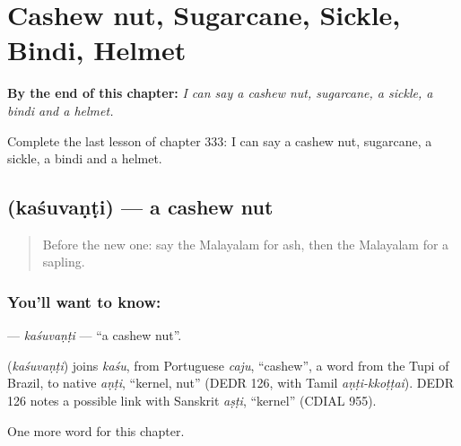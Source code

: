 
\chapter{Cashew nut, Sugarcane, Sickle, Bindi, Helmet}
\label{ch:ml-cashew-nut-sugarcane-sickle-bindi-helmet}

\begin{chapteropening}
\textbf{By the end of this chapter:} \emph{I can say a cashew nut, sugarcane, a sickle, a bindi and a helmet.}

Complete the last lesson of chapter 333: I can say a cashew nut, sugarcane, a sickle, a bindi and a helmet.
\end{chapteropening}

\section[\texorpdfstring{\ml{കശുവണ്ടി} (kaśuvaṇṭi)}{കശുവണ്ടി (kaśuvaṇṭi)}]{ (kaśuvaṇṭi) — a cashew nut}

\label{lesson:ML-C333-kasuvanti}



\begin{quote}
Before the new one: say the Malayalam for ash, then the Malayalam for a sapling.
\end{quote}

\subsection*{You'll want to know: }
\textbf{} — \emph{kaśuvaṇṭi} — \textquotedblleft{}a cashew nut\textquotedblright{}.

\begin{cousinweb}
\textbf{} (\emph{kaśuvaṇṭi}) joins \emph{kaśu}, from Portuguese \emph{caju}, \textquotedblleft{}cashew\textquotedblright{}, a word from the Tupi of Brazil, to native \emph{aṇṭi}, \textquotedblleft{}kernel, nut\textquotedblright{} (DEDR 126, with Tamil \emph{aṇṭi-kkoṭṭai}). DEDR 126 notes a possible link with Sanskrit \emph{aṣṭi}, \textquotedblleft{}kernel\textquotedblright{} (CDIAL 955).
\end{cousinweb}

\begin{grammarlens}[title={What you've built}]
One more word for this chapter.
\end{grammarlens}

